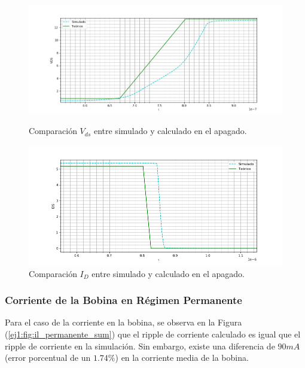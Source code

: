 \begin{figure}[H]
	\centering
	\begin{minipage}{0.5\textwidth}
		\centering
		\includegraphics[width=1.1\textwidth]{ImagenesEjercicio-1/sim_apagado_drain} %
		\caption{Comparación $V_{ds}$ entre simulado y calculado en el apagado.}
		\label{ej1:fig:sim_apagado_drain}
	\end{minipage}\hfill
	\begin{minipage}{0.5\textwidth}
		\centering
		\includegraphics[width=1.1\textwidth]{ImagenesEjercicio-1/sim_apagado_drain_i} %
		\caption{Comparación $I_{D}$ entre simulado y calculado en el apagado.}
		\label{ej1:fig:sim_apagado_drain_i}
	\end{minipage}
\end{figure}

\subsubsection{Corriente de la Bobina en Régimen Permanente}

Para el caso de la corriente en la bobina, se observa en la Figura (\ref{ej1:fig:il_permanente_sum}) que el ripple de corriente calculado es igual que el ripple de corriente en la simulación. Sin embargo, existe una diferencia de $90mA$ (error porcentual de un $1.74\%$) en la corriente media de la bobina.

